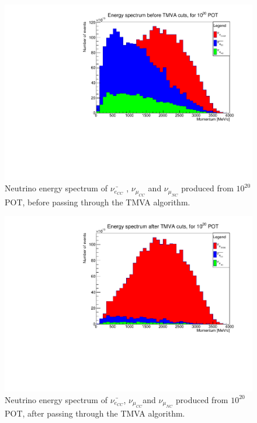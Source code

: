 \begin{figure}[h!]
\centering
\includegraphics[width=.9\textwidth]{figures/NeutrinoChap/SpectrumBeforeTMVA.pdf}
\caption{Neutrino energy spectrum of $\bar{\nu_{e_{CC}}}$ , $\nu_{\mu_{CC}}$ and $\nu_{\mu_{NC}}$ produced from $10^{20}$ POT, before passing through the TMVA algorithm.}
\label{fig:TMVAEspectrumBefore}
\end{figure}


\begin{figure}[h!]
\centering
\includegraphics[width=.9\textwidth]{figures/NeutrinoChap/SpectrumAfterTMVA.pdf}
\caption{Neutrino energy spectrum of $\bar{\nu_{e_{CC}}}$, $\nu_{\mu_{CC}}$and $\nu_{\mu_{NC}}$ produced from $10^{20}$ POT, after passing through the TMVA algorithm.}
\label{fig:TMVAEspectrumAfter}
\end{figure}


